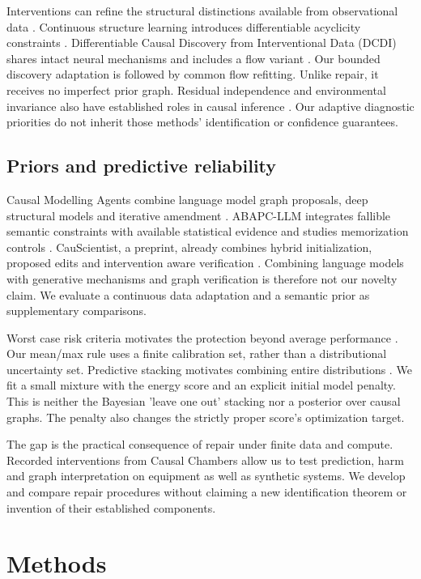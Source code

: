\documentclass{svproc}
\begin{document}
Interventions can refine the structural distinctions available from observational
data \cite{hauser2012}. Continuous structure learning introduces differentiable
acyclicity constraints \cite{zheng2018}. Differentiable Causal Discovery from Interventional Data (DCDI) shares intact
neural mechanisms and includes a flow variant
\cite{brouillard2020}. Our bounded discovery adaptation is followed by common flow
refitting. Unlike repair, it receives no imperfect prior graph. Residual
independence and environmental invariance also have established roles in causal
inference \cite{peters2014,peters2016}. Our adaptive diagnostic priorities do not
inherit those methods' identification or confidence guarantees.

\subsection{Priors and predictive reliability}
Causal Modelling Agents combine language model graph proposals, deep structural
models and iterative amendment \cite{abdulaal2024}. ABAPC-LLM integrates fallible
semantic constraints with available statistical evidence and studies memorization controls
\cite{li2026}. CauScientist, a preprint, already combines hybrid initialization,
proposed edits and intervention aware verification \cite{peng2026}. Combining
language models with generative mechanisms and graph verification is therefore
not our novelty claim. We evaluate a continuous data adaptation and a semantic
prior as supplementary comparisons.

Worst case risk criteria motivates the protection beyond average performance
\cite{hashimoto2018}. Our mean/max rule uses a finite calibration set, rather than
a distributional uncertainty set. Predictive stacking motivates combining entire
distributions \cite{yao2018}. We fit a small mixture with the energy score
\cite{gneiting2007} and an explicit initial model penalty. This is neither
the Bayesian 'leave one out' stacking nor a posterior over causal graphs. The penalty
also changes the strictly proper score's optimization target.

The gap is the practical consequence of repair under finite data and compute.
Recorded interventions from Causal Chambers \cite{gamella2025} allow us to test
prediction, harm and graph interpretation on equipment as well as synthetic
systems. We develop and compare repair procedures without claiming a new
identification theorem or invention of their established components.
\section{Methods}
\end{document}
